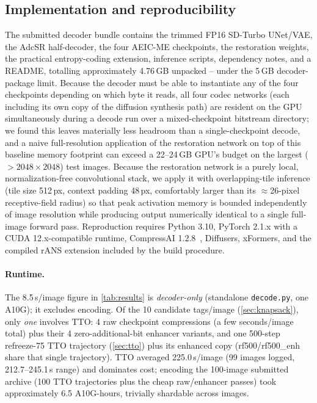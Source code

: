 \documentclass[runningheads]{llncs}
\begin{document}
\subsection{Implementation and reproducibility}
The submitted decoder bundle contains the trimmed FP16 SD-Turbo UNet/VAE, the AdcSR half-decoder, the four AEIC-ME checkpoints, the restoration weights, the practical entropy-coding extension, inference scripts, dependency notes, and a README, totalling approximately 4.76\,GB unpacked -- under the 5\,GB decoder-package limit. Because the decoder must be able to instantiate any of the four checkpoints depending on which byte it reads, all four codec networks (each including its own copy of the diffusion synthesis path) are resident on the GPU simultaneously during a decode run over a mixed-checkpoint bitstream directory; we found this leaves materially less headroom than a single-checkpoint decode, and a naive full-resolution application of the restoration network on top of this baseline memory footprint can exceed a 22--24\,GB GPU's budget on the largest ($>2048\times2048$) test images. Because the restoration network is a purely local, normalization-free convolutional stack, we apply it with overlapping-tile inference (tile size 512\,px, context padding 48\,px, comfortably larger than its $\approx$26-pixel receptive-field radius) so that peak activation memory is bounded independently of image resolution while producing output numerically identical to a single full-image forward pass. Reproduction requires Python 3.10, PyTorch 2.1.x with a CUDA 12.x-compatible runtime, CompressAI 1.2.8~\cite{begaint2020compressai}, Diffusers, xFormers, and the compiled rANS extension included by the build procedure.

\paragraph{Runtime.} The 8.5\,s/image figure in \cref{tab:results} is \emph{decoder-only} (standalone \texttt{decode.py}, one A10G); it excludes encoding. Of the 10 candidate tags/image (\cref{sec:knapsack}), only \emph{one} involves TTO: 4 raw checkpoint compressions (a few seconds/image total) plus their 4 zero-additional-bit enhancer variants, and one 500-step refreeze-75 TTO trajectory (\cref{sec:tto}) plus its enhanced copy (rf500/rf500\_enh share that single trajectory). TTO averaged 225.0\,s/image (99 images logged, 212.7--245.1\,s range) and dominates cost; encoding the 100-image submitted archive (100 TTO trajectories plus the cheap raw/enhancer passes) took approximately 6.5 A10G-hours, trivially shardable across images.
\end{document}
